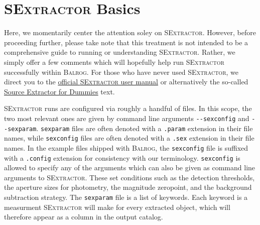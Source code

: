 \documentclass[12pt]{book}
\newcommand{\codett}[1]{\lstinline{#1}}
\newcommand{\balrog}{\textsc{Balrog}}
\newcommand{\sex}{\textsc{SExtractor}}
\newcommand{\opt}[1]{\codett{--#1}}
\begin{document}
\section{\sex{} Basics}
\label{sec:quicksex}

Here, we momentarily center the attention soley on \sex{}.
However, before proceeding further, 
please take note that this treatment is not intended to be a comprehensive guide 
to running or understanding \sex{}.
Rather, we simply offer a few comments which will hopefully help run \sex{} successfully within \balrog{}.
For those who have never used \sex{}, we direct you to the
\href{https://www.astromatic.net/pubsvn/software/sextractor/trunk/doc/sextractor.pdf}{official \sex{} user manual} 
or alternatively the so-called
\href{http://astroa.physics.metu.edu.tr/MANUALS/sextractor/Guide2source\_extractor.pdf}{Source Extractor for Dummies} text.

\sex{} runs are configured via roughly a handful of files. 
In this scope, the two most relevant ones are given by command line arguments \opt{sexconfig}
and \opt{sexparam}. 
\codett{sexparam} files are often denoted with a \codett{.param} extension in their file names,
while \codett{sexconfig} files are often denoted with a \codett{.sex} extension in their file names.
In the example files shipped with \balrog{}, the \codett{sexconfig}
file is suffixed with a \codett{.config} extension for consistency with our terminology.
\codett{sexconfig} is allowed to specify any of the arguments which can
also be given as command line arguments to \sex{}.
These set conditions such as the detection thresholds,
the aperture sizes for photometry, the magnitude zeropoint,
and the background subtraction strategy.
The \codett{sexparam} file is a list of keywords.
Each keyword is a measurment \sex{} will make for every extracted object, which will therefore
appear as a column in the output catalog.
\end{document}
